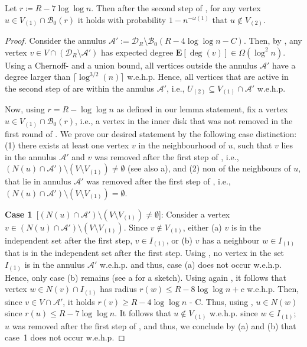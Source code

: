 \documentclass[letterpaper,11pt]{article}
\newcommand{\E}[1]{\mathbf{E}\left[#1\right]}
\newcommand{\wehp}{w.e.h.p.\xspace}
\newcommand{\B}{\mathcal B}
\newcommand{\disk}{\ensuremath{\mathcal D_R}\xspace}
\newcommand{\1}{\mathbb I}
\begin{document}
%
\begin{lemma} \label{lem:cheddar2}
    Let $r \coloneqq R - {7\log\log n}$. Then after the second step of \algo, for any vertex $u \in V_{(1)} \cap \mathcal{B}_0(r)$ it holds with probability $1 - n^{-\omega(1)}$ that $u \not\in V_{(2)}$. 
\end{lemma}
%
\begin{proof}
Consider the annulus $\mathcal{A}' := \disk\setminus \B_0(R - 4 \log\log n - C)$. Then, by , any vertex $v \in V \cap (\disk\setminus\mathcal{A}' )$ has expected degree $\E{\deg(v)} \in \Omega(\log^2 n)$. Using a Chernoff- and a union bound, all vertices outside the annulus $\mathcal{A}' $ have a degree larger than $\lceil \log^{3/2}(n)\rceil$ \wehp Hence, all vertices that are active in the second step of \algo are within the annulus $\mathcal{A}' $, i.e., $U_{(2)} \subseteq V_{(1)} \cap \mathcal{A}' $ \wehp

Now, using $r= R- \log\log n$ as defined in our lemma statement, fix a vertex $u \in V_{(1)} \cap \B_0(r)$, i.e., a vertex in the inner disk that was not removed in the first round of \algo. We prove our desired statement by the following case distinction: (1) there exists at least one vertex $v$ in the neighbourhood of $u$, such that $v$ lies in the annulus $\mathcal{A}' $ and $v$ was removed after the first step of \algo, i.e., $(N(u) \cap \mathcal{A}' )\setminus (V \setminus V_{(1)}) \neq \emptyset$ (see also a), and (2) non of the neighbours of $u$, that lie in annulus $\mathcal{A}' $ was removed after the first step of \algo, i.e., $(N(u) \cap \mathcal{A}' )\setminus (V \setminus V_{(1)}) = \emptyset$.

\smallskip

\textbf{Case 1}~[$(N(u) \cap \mathcal{A}' )\setminus (V \setminus V_{(1)}) \neq \emptyset$]: Consider a vertex $v \in (N(u) \cap \mathcal{A}' )\setminus (V \setminus V_{(1)})$. Since $v \notin V_{(1)}$, either (a) $v$ is in the independent set after the first step, $v \in I_{(1)}$, or (b) $v$ has a neighbour $w \in I_{(1)}$ that is in the independent set after the first step. Using , no vertex in the set $I_{(1)}$ is in the annulus $\mathcal{A}'$ \wehp and thus, case (a) does not occur \wehp Hence, only case (b) remains  (see a for a sketch). Using again , it follows that vertex $w \in N(v) \cap I_{(1)}$ has radius $r(w) \leq R - 8\log\log n + c$ \wehp Then, since $v \in V \cap \mathcal{A}'$, it holds $r(v) \geq R - 4\log\log n$ - C. Thus, using , $u \in N(w)$ since $r(u) \leq R - 7\log\log n$. It follows that $u \not\in V_{(1)}$ \wehp since $w \in I_{(1)}$; $u$ was removed after the first step of \algo, and thus, we conclude by (a) and (b) that case~1 does not occur \wehp


\end{proof}
\end{document}
